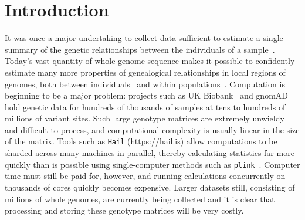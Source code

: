 \documentclass{article}
\begin{document}
%
%
%
%
%
%
%
%
%



\section*{Introduction}

It was once a major undertaking to collect data sufficient to estimate a single summary
of the genetic relationships between the individuals of a
sample~\citep[e.g.,][]{Kreitman1983-xr}.
Today's vast quantity of whole-genome sequence
makes it possible to confidently estimate many more properties of genealogical relationships
in local regions of genomes, both between
individuals~\citep[e.g.,][]{browning2010highresolution,aguillon2017deconstructing}
and within
populations~\citep[e.g.,][]{booker2018understanding,haenel2018metaanalysis,stankowski2019widespread}.
Computation is beginning to be a major problem:
projects such as UK Biobank~\citep{bycroft2018genome}
and gnomAD~\citep{karczewski2019variation} hold genetic data for
hundreds of thousands of samples at tens to hundreds of millions of variant sites.
Such large genotype matrices are extremely unwieldy and difficult to process,
and computational complexity is usually linear in the size of the matrix.
Tools such as \texttt{Hail} (\url{https://hail.is}) allow computations to be sharded
across many machines in parallel, thereby calculating statistics far more
quickly than is possible using single-computer methods such as
\texttt{plink}~\citep{purcell2007plink}. Computer time must still be
paid for, however, and running calculations concurrently on thousands of cores quickly
becomes expensive. Larger datasets still, consisting of millions of whole
genomes, are currently being collected and it is clear that processing
and storing these genotype matrices will be very costly.
\end{document}
